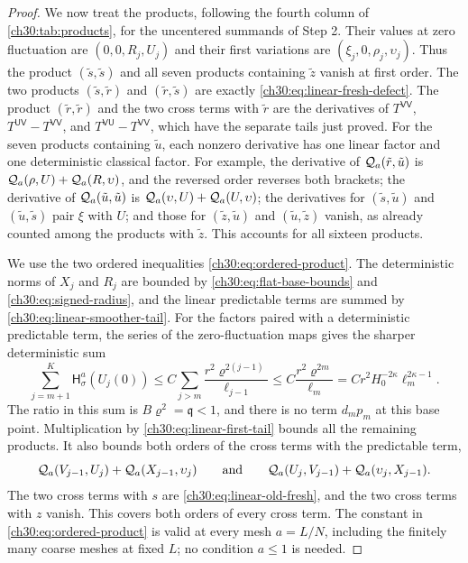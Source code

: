 \begin{proof}
We now treat the products, following the fourth column of \cref{ch30:tab:products}, for the uncentered summands of Step 2. Their values at zero fluctuation are $(0,0,R_j,U_j)$ and their first variations are $(\xi_j,0,\rho_j,\upsilon_j)$. Thus the product $(\tilde s,\tilde s)$ and all seven products containing $\tilde z$ vanish at first order. The two products $(\tilde s,\tilde r)$ and $(\tilde r,\tilde s)$ are exactly \eqref{ch30:eq:linear-fresh-defect}. The product $(\tilde r,\tilde r)$ and the two cross terms with $\tilde r$ are the derivatives of $T^{\mathsf{VV}}$, $T^{\mathsf{UV}}-T^{\mathsf{VV}}$, and $T^{\mathsf{VU}}-T^{\mathsf{VV}}$, which have the separate tails just proved. For the seven products containing $\tilde u$, each nonzero derivative has one linear factor and one deterministic classical factor. For example, the derivative of $\mathcal Q_{a}(\tilde r,\tilde u)$ is $\mathcal Q_{a}(\rho,U)+\mathcal Q_{a}(R,\upsilon)$, and the reversed order reverses both brackets; the derivative of $\mathcal Q_{a}(\tilde u,\tilde u)$ is $\mathcal Q_{a}(\upsilon,U)+\mathcal Q_{a}(U,\upsilon)$; the derivatives for $(\tilde s,\tilde u)$ and $(\tilde u,\tilde s)$ pair $\xi$ with $U$; and those for $(\tilde z,\tilde u)$ and $(\tilde u,\tilde z)$ vanish, as already counted among the products with $\tilde z$. This accounts for all sixteen products.

We use the two ordered inequalities \eqref{ch30:eq:ordered-product}. The deterministic norms of $X_j$ and $R_j$ are bounded by \eqref{ch30:eq:flat-base-bounds} and \eqref{ch30:eq:signed-radius}, and the linear predictable terms are summed by \eqref{ch30:eq:linear-smoother-tail}. For the factors paired with a deterministic predictable term, the series of the zero-fluctuation maps gives the sharper deterministic sum
\begin{equation}\label{ch30:eq:linear-classical-smoother}
 \sum_{j=m+1}^K\mathsf H_\sigma^a(U_j(0))\le C\sum_{j>m}\frac{r^2\varrho^{2(j-1)}}{\ell_{j-1}}\le C\frac{r^2\varrho^{2m}}{\ell_m}=Cr^2H_0^{-2\kappa}\ell_m^{2\kappa-1}.
\end{equation}
The ratio in this sum is $B\varrho^2=\mathfrak q<1$, and there is no term $d_mp_m$ at this base point. Multiplication by \eqref{ch30:eq:linear-first-tail} bounds all the remaining products. It also bounds both orders of the cross terms with the predictable term,
\[
 \mathcal Q_{a}(V_{j-1},U_j)+\mathcal Q_{a}(X_{j-1},\upsilon_j)\qquad\text{and}\qquad\mathcal Q_{a}(U_j,V_{j-1})+\mathcal Q_{a}(\upsilon_j,X_{j-1}).
\]
The two cross terms with $s$ are \eqref{ch30:eq:linear-old-fresh}, and the two cross terms with $z$ vanish. This covers both orders of every cross term. The constant in \eqref{ch30:eq:ordered-product} is valid at every mesh $a=L/N$, including the finitely many coarse meshes at fixed $L$; no condition $a\le1$ is needed.


\end{proof}
